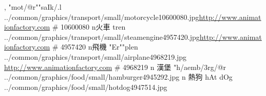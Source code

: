 \begin{tGe}{14}{, }
   {} {"mot{/@r}""saIk{/.l}} {../common/graphics/transport/small/motorcycle10600080.jpg}{\url{http://www.animationfactory.com} \;\# 10600080}
       {n}{火車}   {}{tren}               {../common/graphics/transport/small/steamengine4957420.jpg}{\url{http://www.animationfactory.com} \;\# 4957420}
    {n}{飛機}   {}{"Er""plen}          {../common/graphics/transport/small/airplane4968219.jpg }{\url{http://www.animationfactory.com} \;\# 4968219}
     {n} {漢堡}  {}{"h{/ae}mb{/3r}g{/@r}} {../common/graphics/food/small/hamburger4945292.jpg}    {}
       {n} {熱狗}  {}{hAt dOg}             {../common/graphics/food/small/hotdog4947514.jpg}       {}

\end{tGe}

